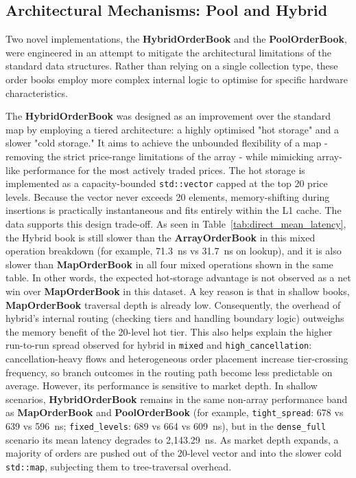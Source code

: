 \subsection{Architectural Mechanisms: Pool and Hybrid}
\label{subsec:pool_hybrid_mech}
Two novel implementations, the \textbf{HybridOrderBook} and the \textbf{PoolOrderBook},
were engineered in an attempt to mitigate the architectural limitations of the standard
data structures. Rather than relying on a single collection type, these order books employ
more complex internal logic to optimise for specific hardware characteristics.

The \textbf{HybridOrderBook} was designed as an improvement over the standard map by
employing a tiered architecture: a highly optimised "hot storage" and a slower
"cold storage." It aims to achieve the unbounded flexibility of a map - removing the
strict price-range limitations of the array - while mimicking array-like performance
for the most actively traded prices. The hot storage is implemented as a
capacity-bounded \texttt{std::vector} capped at the top 20 price levels. Because the
vector never exceeds 20 elements, memory-shifting during insertions is practically
instantaneous and fits entirely within the L1 cache. The data supports this
design trade-off. As seen in Table~\ref{tab:direct_mean_latency}, the Hybrid book
is still slower than the \textbf{ArrayOrderBook} in this mixed
operation breakdown (for example, 71.3~ns vs 31.7~ns on lookup), and it is also
slower than \textbf{MapOrderBook} in all four mixed operations shown in the same table. In other
words, the expected hot-storage advantage is not observed as a net win over \textbf{MapOrderBook}
in this dataset. A key reason is that in shallow books, \textbf{MapOrderBook} traversal depth is 
already low. Consequently, the overhead of hybrid's internal routing (checking 
tiers and handling boundary logic) outweighs the memory benefit of the 20-level hot tier.
 This also helps explain the higher
run-to-run spread observed for hybrid in \texttt{mixed} and
\texttt{high\_cancellation}: cancellation-heavy flows and heterogeneous order placement
increase tier-crossing frequency, so branch outcomes in the routing path become
less predictable on average. However, its
performance is sensitive to market depth.
In shallow scenarios, \textbf{HybridOrderBook} remains in the same non-array
performance band as \textbf{MapOrderBook} and \textbf{PoolOrderBook}
(for example, \texttt{tight\_spread}: 678 vs 639 vs 596~ns;
\texttt{fixed\_levels}: 689 vs 664 vs 609~ns),
but in the \texttt{dense\_full} scenario
its mean latency degrades to 2,143.29~ns. As market depth expands, a majority of orders
are pushed out of the 20-level vector and into the slower cold \texttt{std::map},
subjecting them to tree-traversal overhead.

